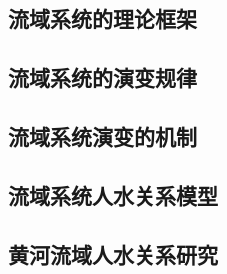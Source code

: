 \subsection{流域系统的理论框架}\label{ch1:sec:theories}


\subsection{流域系统的演变规律}\label{ch1:sec:process}


\subsection{流域系统演变的机制}\label{ch1:sec:mechanism}


\subsection{流域系统人水关系模型}\label{ch1:sec:model}


\subsection{黄河流域人水关系研究}\label{ch1:sec:yellow_river}
